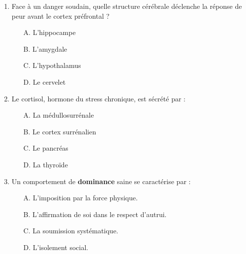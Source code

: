 \documentclass[11pt]{article}
\begin{document}
\begin{exercice}
\begin{enumerate}
    \item Face à un danger soudain, quelle structure cérébrale déclenche la réponse de peur avant le cortex préfrontal ?
    \begin{itemize}
        \item[A.] L'hippocampe
        \item[B.] L'amygdale
        \item[C.] L'hypothalamus
        \item[D.] Le cervelet
    \end{itemize}
    \item Le cortisol, hormone du stress chronique, est sécrété par :
    \begin{itemize}
        \item[A.] La médullosurrénale
        \item[B.] Le cortex surrénalien
        \item[C.] Le pancréas
        \item[D.] La thyroïde
    \end{itemize}
    \item Un comportement de \textbf{dominance} saine se caractérise par :
    \begin{itemize}
        \item[A.] L'imposition par la force physique.
        \item[B.] L'affirmation de soi dans le respect d'autrui.
        \item[C.] La soumission systématique.
        \item[D.] L'isolement social.
    \end{itemize}
\end{enumerate}
\end{exercice}
\end{document}
